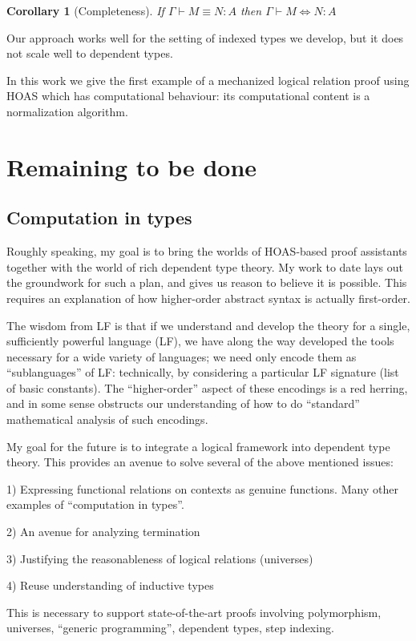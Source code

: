 \documentclass{article}
\newtheorem{corollary}{Corollary}
\begin{document}
\begin{corollary}[Completeness]
If $\Gamma \vdash M \equiv N : A$ then $\Gamma \vdash M
\Leftrightarrow N : A$
\end{corollary}

Our approach works well for the setting of indexed types we develop,
but it does not scale well to dependent types.

In this work we give the first example of a mechanized logical
relation proof using HOAS which has computational behaviour: its
computational content is a normalization algorithm.

\section{Remaining to be done}
\subsection{Computation in types}
Roughly speaking, my goal is to bring the worlds of HOAS-based proof
assistants together with the world of rich dependent type theory. My
work to date lays out the groundwork for such a plan, and gives us
reason to believe it is possible. This requires an explanation of how
higher-order abstract syntax is actually first-order.

The wisdom from LF is that if we understand and develop the theory for
a single, sufficiently powerful language (LF), we have along the way
developed the tools necessary for a wide variety of languages; we need
only encode them as ``sublanguages'' of LF: technically, by
considering a particular LF signature (list of basic constants). The
``higher-order'' aspect of these encodings is a red herring, and
in some sense obstructs our understanding of how to do ``standard''
mathematical analysis of such encodings.

My goal for the future is to integrate a logical framework into
dependent type theory. This provides an avenue to solve several of the
above mentioned issues:


1) Expressing functional relations on contexts as genuine
functions. Many other examples of ``computation in types''.

2) An avenue for analyzing termination

3) Justifying the reasonableness of logical relations (universes)

4) Reuse understanding of inductive types

This is necessary to support state-of-the-art proofs involving polymorphism,
universes, ``generic programming'', dependent types, step indexing.
\end{document}
